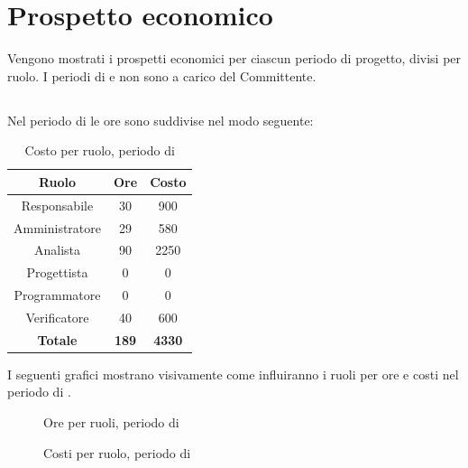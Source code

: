 \section{Prospetto economico}
Vengono mostrati i prospetti economici per ciascun periodo di progetto, divisi per ruolo. I periodi di \AR{} e \AD{} non sono a carico del Committente.

\subsection{\AR}
Nel periodo di \AR{} le ore sono suddivise nel modo seguente:
\begin{table}[H]
	\centering
	\begin{tabular}{|c|c|c|}
		\hline
		\textbf{Ruolo} &
		\textbf{Ore} &
		\textbf{Costo} \\
		\hline
		Responsabile & 30 & 900\\
		\hline
		Amministratore & 29 & 580\\
		\hline
		Analista & 90 & 2250\\
		\hline
		Progettista & 0 & 0 \\
		\hline
		Programmatore & 0 & 0 \\
		\hline
		Verificatore & 40 & 600\\
		\hline
		\textbf{Totale} & \textbf{189} & \textbf{4330} \\
		\hline
	\end{tabular}
	\caption{Costo per ruolo, periodo di \AR}
\end{table}

I seguenti grafici mostrano visivamente come influiranno i ruoli per ore e costi nel periodo di \AR.
\begin{figure}[H]
	\centering
	\caption{Ore per ruoli, periodo di \AR}
\end{figure}
\begin{figure}[H]
	\centering
	\caption{Costi per ruolo, periodo di \AR}
\end{figure}

